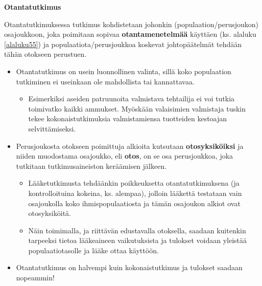 \documentclass[
]{book}
\providecommand{\tightlist}{%
  \setlength{\itemsep}{0pt}\setlength{\parskip}{0pt}}
\begin{document}
\begin{defblock}{}

\textbf{Otantatutkimus}

Otantatutkimuksessa tutkimus kohdistetaan johonkin (populaation/perusjoukon) osajoukkoon, joka poimitaan sopivaa \textbf{otantamenetelmää} käyttäen (ks. alaluku \ref{alaluku55}) ja populaatiota/perusjoukkoa koskevat johtopäätelmät tehdään tähän otokseen perustuen.

\begin{itemize}
\tightlist
\item
  Otantatutkimus on usein luonnollinen valinta, sillä koko populaation tutkiminen ei useinkaan ole mahdollista tai kannattavaa.

  \begin{itemize}
  \tightlist
  \item
    Esimerkiksi aseiden patruunoita valmistava tehtailija ei voi tutkia toimivatko kaikki ammukset. Myöskään valaisimien valmistaja tuskin tekee kokonaistutkimuksia valmistamiensa tuotteiden kestoajan selvittämiseksi.\\
  \end{itemize}
\item
  Perusjoukosta otokseen poimittuja alkioita kutsutaan \textbf{otosyksiköiksi} ja niiden muodostama osajoukko, eli \textbf{otos}, on se osa perusjoukkoa, joka tutkitaan tutkimusaineiston keräämisen jälkeen.

  \begin{itemize}
  \tightlist
  \item
    Lääketutkimusta tehdäänkin poikkeuksetta otantatutkimuksena (ja kontrolloituina kokeina, ks. alempaa), jolloin lääkettä testataan vain osajoukolla koko ihmispopulaatiosta ja tämän osajoukon alkiot ovat otosyksiköitä.
  \item
    Näin toimimalla, ja riittävän edustavalla otoksella, saadaan kuitenkin tarpeeksi tietoa lääkeaineen vaikutuksista ja tulokset voidaan yleistää populaatiotasolle ja lääke ottaa käyttöön.
  \end{itemize}
\item
  Otantatutkimus on halvempi kuin kokonaistutkimus ja tulokset saadaan nopeammin!
\end{itemize}

\end{defblock}

\hfill\break
\end{document}
